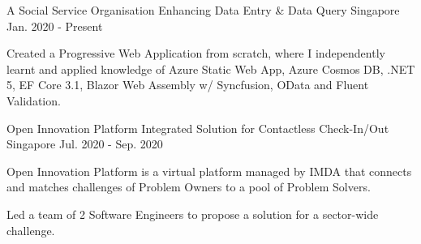 

\begin{cventries}

  \cventry
    {A Social Service Organisation} %
    {Enhancing Data Entry \& Data Query} %
    {Singapore} %
    {Jan. 2020 - Present} %
    {
      \begin{cvitems} %
        \item {Created a Progressive Web Application from scratch, where I independently learnt and applied knowledge of Azure Static Web App, Azure Cosmos DB, .NET 5, EF Core 3.1, Blazor Web Assembly w/ Syncfusion, OData and Fluent Validation.}
      \end{cvitems}
    }

  \cventry
    {Open Innovation Platform} %
    {Integrated Solution for Contactless Check-In/Out} %
    {Singapore} %
    {Jul. 2020 - Sep. 2020} %
    {
      \begin{cvitems} %
        \item {Open Innovation Platform is a virtual platform managed by IMDA that connects and matches challenges of Problem Owners to a pool of Problem Solvers.}
        \item {Led a team of 2 Software Engineers to propose a solution for a sector-wide challenge.}
      \end{cvitems}
    }


\end{cventries}
